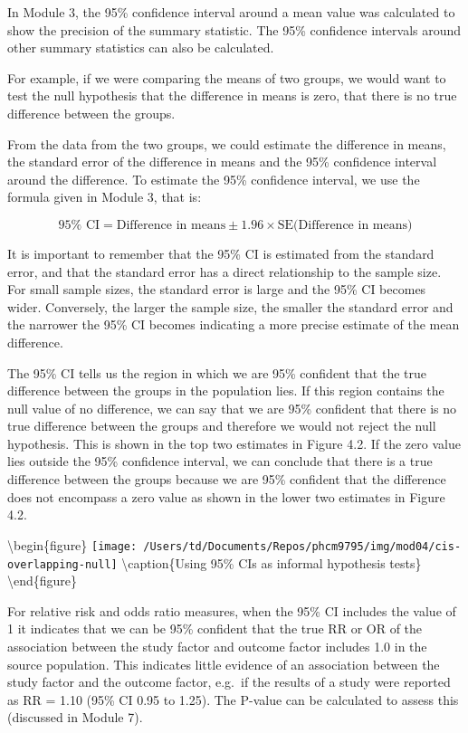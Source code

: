 \documentclass[
]{memoir}
\begin{document}
In Module 3, the 95\% confidence interval around a mean value was calculated to show the precision of the summary statistic. The 95\% confidence intervals around other summary statistics can also be calculated.

For example, if we were comparing the means of two groups, we would want to test the null hypothesis that the difference in means is zero, that there is no true difference between the groups.

From the data from the two groups, we could estimate the difference in means, the standard error of the difference in means and the 95\% confidence interval around the difference. To estimate the 95\% confidence interval, we use the formula given in Module 3, that is:

\[ 95\% \text{ CI} = \text{Difference in means} \pm 1.96 \times \text{SE}(\text{Difference in means)} \]

It is important to remember that the 95\% CI is estimated from the standard error, and that the standard error has a direct relationship to the sample size. For small sample sizes, the standard error is large and the 95\% CI becomes wider. Conversely, the larger the sample size, the smaller the standard error and the narrower the 95\% CI becomes indicating a more precise estimate of the mean difference.

The 95\% CI tells us the region in which we are 95\% confident that the true difference between the groups in the population lies. If this region contains the null value of no difference, we can say that we are 95\% confident that there is no true difference between the groups and therefore we would not reject the null hypothesis. This is shown in the top two estimates in Figure 4.2. If the zero value lies outside the 95\% confidence interval, we can conclude that there is a true difference between the groups because we are 95\% confident that the difference does not encompass a zero value as shown in the lower two estimates in Figure 4.2.

\textbackslash begin\{figure\}
\texttt{[image: /Users/td/Documents/Repos/phcm9795/img/mod04/cis-overlapping-null]} \textbackslash caption\{Using 95\% CIs as informal hypothesis tests\}\label{fig:cis-overlapping-null}
\textbackslash end\{figure\}

For relative risk and odds ratio measures, when the 95\% CI includes the value of 1 it indicates that we can be 95\% confident that the true RR or OR of the association between the study factor and outcome factor includes 1.0 in the source population. This indicates little evidence of an association between the study factor and the outcome factor, e.g.~if the results of a study were reported as RR = 1.10 (95\% CI 0.95 to 1.25). The P-value can be calculated to assess this (discussed in Module 7).
\end{document}
